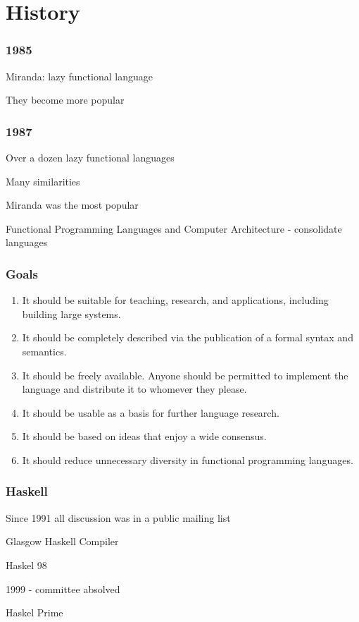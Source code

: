 \section{History}

\frame{\sectionpage}

\begin{frame}
\frametitle{1985}

Miranda: lazy functional language


They become more popular
\end{frame}

\begin{frame}
\frametitle{1987}

Over a dozen lazy functional languages

Many similarities

Miranda was the most popular

Functional Programming Languages and Computer Architecture - consolidate languages
\end{frame}

\begin{frame}
\frametitle{Goals}

\begin{enumerate}
\item It should be suitable for teaching, research, and applications,
  including building large systems.
\item It should be completely described via the publication of a
  formal syntax and semantics.
\item It should be freely available. Anyone should be permitted to
  implement the language and distribute it to whomever they please.
\item It should be usable as a basis for further language research.
\item It should be based on ideas that enjoy a wide consensus.
\item It should reduce unnecessary diversity in functional programming
  languages.
\end{enumerate}
\end{frame}

\begin{frame}
\frametitle{Haskell}

Since 1991 all discussion was in a public mailing list

Glasgow Haskell Compiler

Haskel 98

1999 - committee absolved

Haskel Prime
\end{frame}

